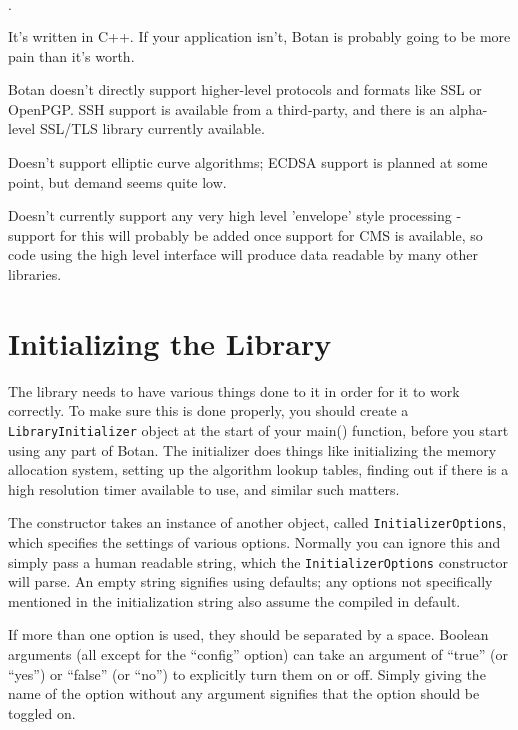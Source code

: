 \documentclass{article}
\newcommand{\type}[1]{\texttt{#1}}
\begin{document}
\begin{list}{$\cdot$}
  \item It's written in C++. If your application isn't, Botan is probably
        going to be more pain than it's worth.
  \item

  \item Botan doesn't directly support higher-level protocols and
        formats like SSL or OpenPGP. SSH support is available from a
        third-party, and there is an alpha-level SSL/TLS library
        currently available.

  \item Doesn't support elliptic curve algorithms; ECDSA support is planned at
        some point, but demand seems quite low.

  \item Doesn't currently support any very high level 'envelope' style
        processing - support for this will probably be added once support for
        CMS is available, so code using the high level interface will produce
        data readable by many other libraries.
\end{list}

\pagebreak

\section{Initializing the Library}

The library needs to have various things done to it in order for it to work
correctly. To make sure this is done properly, you should create a
\type{LibraryInitializer} object at the start of your main() function, before
you start using any part of Botan. The initializer does things like
initializing the memory allocation system, setting up the algorithm lookup
tables, finding out if there is a high resolution timer available to use, and
similar such matters.

The constructor takes an instance of another object, called
\type{InitializerOptions}, which specifies the settings of various
options. Normally you can ignore this and simply pass a human readable
string, which the \type{InitializerOptions} constructor will parse. An
empty string signifies using defaults; any options not specifically
mentioned in the initialization string also assume the compiled in
default.

If more than one option is used, they should be separated by a
space. Boolean arguments (all except for the ``config'' option) can
take an argument of ``true'' (or ``yes'') or ``false'' (or ``no'') to
explicitly turn them on or off. Simply giving the name of the option
without any argument signifies that the option should be toggled on.
\end{document}
